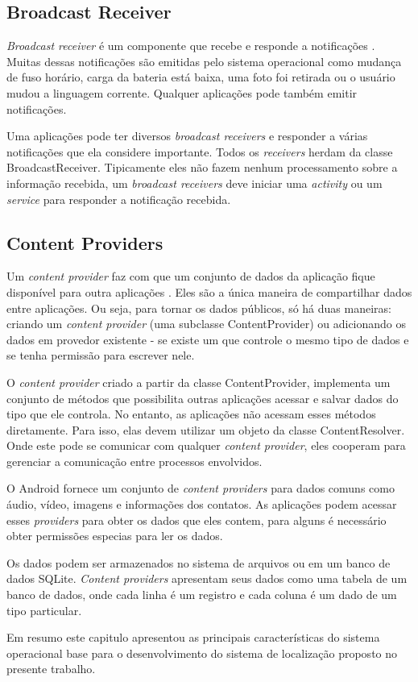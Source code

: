 \subsection{Broadcast Receiver}
\textit{Broadcast receiver} é um componente que recebe e responde a notificações \cite{receiver}. %
Muitas dessas notificações são emitidas pelo sistema operacional como mudança de fuso horário, 
carga da bateria está baixa, uma foto foi retirada ou o usuário mudou a linguagem corrente.
Qualquer aplicações pode também emitir notificações.

Uma aplicações pode ter diversos \textit{broadcast receivers} 
e responder a várias notificações que ela considere importante. Todos os \textit{receivers} 
herdam da classe BroadcastReceiver. Tipicamente eles não fazem nenhum processamento sobre a 
informação recebida, um \textit{broadcast receivers} deve iniciar uma \textit{activity} ou um \textit{service} para 
responder a notificação recebida.

\subsection{Content Providers}
Um \textit{content provider} faz com que um conjunto de dados da aplicação fique disponível para outra aplicações \cite{provider}. 
Eles são a única maneira de compartilhar dados entre aplicações. Ou seja, para tornar os dados públicos, só há duas maneiras: 
criando um \textit{content provider}
(uma subclasse ContentProvider) ou adicionando os dados em provedor existente -
se existe um que controle o mesmo tipo de dados e se tenha permissão para escrever nele.

O \textit{content provider} criado a partir da classe ContentProvider, implementa um conjunto de métodos
 que possibilita outras aplicações acessar e salvar dados do tipo que ele controla. No entanto, as aplicações 
 não acessam esses métodos diretamente. Para isso, elas devem utilizar um objeto da classe ContentResolver. 
 Onde este pode se comunicar com qualquer \textit{content provider}, eles cooperam para gerenciar a comunicação 
 entre processos envolvidos.
 
O Android fornece um conjunto de \textit{content providers} para dados comuns como 
áudio, vídeo, imagens e informações dos contatos. As aplicações podem acessar esses \textit{providers} 
para obter os dados que eles contem, para alguns é necessário obter permissões especias para ler os dados.

Os dados podem ser armazenados no sistema de arquivos ou em um banco de dados SQLite. 
\textit{Content providers} apresentam seus dados como uma tabela de um banco de dados, 
onde cada linha é um registro e cada coluna é um dado de um tipo particular. 


Em resumo este capitulo apresentou as principais características do sistema operacional base para o desenvolvimento do 
sistema de localização proposto no presente trabalho.